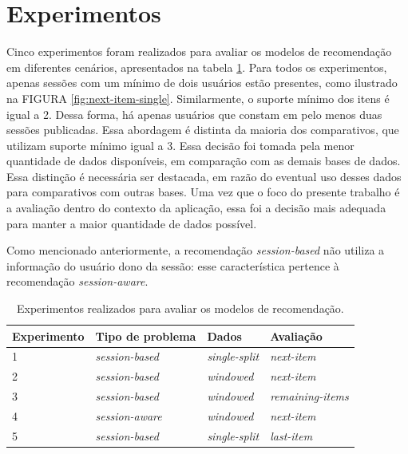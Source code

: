   \newpage

  \section{Experimentos}
  Cinco experimentos foram realizados para avaliar os modelos de recomendação em
  diferentes cenários, apresentados na tabela \ref{tab:experiments}. Para todos
  os experimentos, apenas sessões com um mínimo de dois usuários estão
  presentes, como ilustrado na FIGURA \ref{fig:next-item-single}. Similarmente,
  o suporte mínimo dos itens é igual a 2. Dessa forma, há apenas usuários que
  constam em pelo menos duas sessões publicadas. Essa abordagem é distinta da
  maioria dos comparativos, que utilizam suporte mínimo igual a 3. Essa decisão
  foi tomada pela menor quantidade de dados disponíveis, em comparação com as
  demais bases de dados. Essa distinção é necessária ser destacada, em razão do
  eventual uso desses dados para comparativos com outras bases. Uma vez que o
  foco do presente trabalho é a avaliação dentro do contexto da aplicação, essa
  foi a decisão mais adequada para manter a maior quantidade de dados possível.



  Como
  mencionado anteriormente, a recomendação \textit{session-based} não utiliza a
  informação do usuário dono da sessão: esse característica pertence à
  recomendação \textit{session-aware}.
  \begin{table}
    \centering
    \begin{tabular}{|l|l|l|l|}
      \hline
      Experimento & Tipo de problema & Dados & Avaliação \\ \hline
      1 & \textit{session-based} & \textit{single-split} & \textit{next-item} \\ \hline
      2 & \textit{session-based} & \textit{windowed} & \textit{next-item} \\ \hline
      3 & \textit{session-based} & \textit{windowed} & \textit{remaining-items} \\ \hline
      4 & \textit{session-aware} & \textit{windowed} & \textit{next-item} \\ \hline
      5 & \textit{session-based} & \textit{single-split} & \textit{last-item} \\ \hline
    \end{tabular}
    \caption{Experimentos realizados para avaliar os modelos de recomendação.}
    \label{tab:experiments}
  \end{table}

